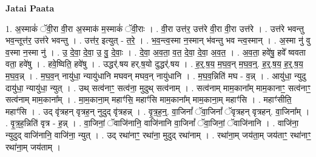 \documentclass[17pt]{extarticle}
\begin{document}
\textbf{Jatai Paata} \newline

1. अ॒स्माकं॑ ॅवी॒रा वी॒रा अ॒स्माक॑ म॒स्माकं॑ ॅवी॒राः । . वी॒रा उत्त॑र॒ उत्त॑रे वी॒रा वी॒रा उत्त॑रे । . उत्त॑रे भवन्तु भव॒न्तूत्त॑र॒ उत्त॑रे भवन्तु । . उत्त॑र॒ इत्युत् - त॒रे॒ । . भ॒व॒न्त्व॒स्मा न॒स्मान् भ॑वन्तु भव न्त्व॒स्मान् । . अ॒स्मा नु॑ वु व॒स्मा न॒स्मा नु॑ । . उ॒ दे॒वा॒ दे॒वा॒ उ॒ वु॒ दे॒वाः॒ । . दे॒वा॒ अ॒व॒ता॒ व॒त॒ दे॒वा॒ दे॒वा॒ अ॒व॒त॒ । . अ॒व॒ता॒ हवे॑षु॒ हवे᳚ ष्ववता वता॒ हवे॑षु । . हवे॒ष्विति॒ हवे॑षु । . उद्धर्॑.षय हर्.ष॒यो दुद्धर्॑.षय । . ह॒र्॒.ष॒य॒ म॒घ॒व॒न् म॒घ॒व॒न्॒. ह॒र्॒.ष॒य॒ ह॒र्॒.ष॒य॒ म॒घ॒व॒न्न् । . म॒घ॒व॒न् नायु॑धा॒ न्यायु॑धानि मघवन् मघव॒न् नायु॑धानि । . म॒घ॒व॒न्निति॑ मघ - व॒न्न् । . आयु॑धा॒ न्युदु दायु॑धा॒ न्यायु॑धा॒ न्युत् । . उथ् सत्व॑नाꣳ॒॒ सत्व॑ना॒ मुदुथ् सत्व॑नाम् । . सत्व॑नाम् माम॒काना᳚म् माम॒कानाꣳ॒॒ सत्व॑नाꣳ॒॒ सत्व॑नाम् माम॒काना᳚म् । . मा॒म॒काना॒म् महाꣳ॑सि॒ महाꣳ॑सि माम॒काना᳚म् माम॒काना॒म् महाꣳ॑सि । . महाꣳ॑सीति॒ महाꣳ॑सि । . उद् वृ॑त्रहन् वृत्रह॒न् नुदुद् वृ॑त्रहन्न् । . वृ॒त्र॒ह॒न्॒. वा॒जिनां᳚ ॅवा॒जिनां᳚ ॅवृत्रहन् वृत्रहन्. वा॒जिना᳚म् । . वृ॒त्र॒ह॒न्निति॑ वृत्र - ह॒न्न् । . वा॒जिनां॒ ॅवाजि॑नानि॒ वाजि॑नानि वा॒जिनां᳚ ॅवा॒जिनां॒ ॅवाजि॑नानि । . वाजि॑ना॒ न्युदुद् वाजि॑नानि॒ वाजि॑ना॒ न्युत् । . उद् रथा॑नाꣳ॒॒ रथा॑ना॒ मुदुद् रथा॑नाम् । . रथा॑ना॒म् जय॑ता॒म् जय॑ताꣳ॒॒ रथा॑नाꣳ॒॒ रथा॑ना॒म् जय॑ताम् । \newline
\end{document}
